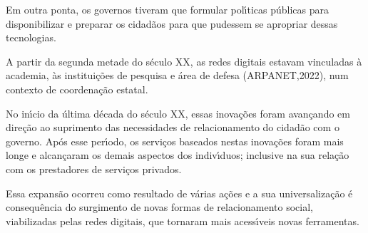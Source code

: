 \documentclass[
12pt,		%
openright,	%
twoside,  %
a4paper,			%
chapter=TITLE,		%
english,			%
french,				%
spanish,			%
brazil				%
]{USPSC-classe/USPSC}
\begin{document}
Em outra ponta, os governos tiveram que formular pol\'{\i}ticas p\'ublicas para disponibilizar e preparar os cidad\~aos para que pudessem se apropriar dessas tecnologias.

















A partir da segunda metade do s\'eculo XX, as redes digitais estavam vinculadas \`a academia, \`as institui\c{c}\~oes de pesquisa e \'area de defesa (ARPANET,2022), num contexto de coordena\c{c}\~ao estatal.

















No in\'{\i}cio da \'ultima d\'ecada do s\'eculo XX, essas inova\c{c}\~oes  foram avan\c{c}ando em dire\c{c}\~ao ao suprimento das necessidades de relacionamento do cidad\~ao com o governo. Ap\'os esse per\'{\i}odo, os servi\c{c}os baseados nestas inova\c{c}\~oes foram mais longe e alcan\c{c}aram  os demais aspectos dos indiv\'{\i}duos; inclusive na sua rela\c{c}\~ao com os prestadores de servi\c{c}os privados.

















Essa expans\~ao ocorreu como resultado de v\'arias a\c{c}\~oes e a sua universaliza\c{c}\~ao \'e consequ\^encia do surgimento de novas formas de relacionamento social, viabilizadas pelas redes digitais, que tornaram mais acess\'{\i}veis novas ferramentas.
\end{document}

